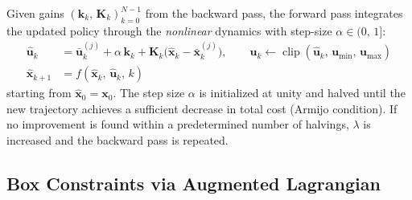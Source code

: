 \documentclass[12pt, a4paper]{article}
\begin{document}
Given gains $(\bm{k}_k,\, \bm{K}_k)_{k=0}^{N-1}$ from the backward pass, the
forward pass integrates the updated policy through the \emph{nonlinear} dynamics
with step-size $\alpha \in (0,\, 1]$:
%
\begin{align}
    \hat{\bm{u}}_k &= \bar{\bm{u}}_k^{(j)}
        + \alpha\,\bm{k}_k
        + \bm{K}_k\bigl(\hat{\bm{x}}_k - \bar{\bm{x}}_k^{(j)}\bigr),
    \qquad
    \hat{\bm{u}}_k \leftarrow
        \operatorname{clip}\!\left(\hat{\bm{u}}_k,\,
        \bm{u}_{\min},\, \bm{u}_{\max}\right)
    \label{eq:fwd_u_app} \\[4pt]
    \hat{\bm{x}}_{k+1} &= f\!\left(\hat{\bm{x}}_k,\,
        \hat{\bm{u}}_k,\, k\right)
    \label{eq:fwd_x_app}
\end{align}
%
starting from $\hat{\bm{x}}_0 = \bm{x}_0$. The step size $\alpha$ is
initialized at unity and halved until the new trajectory achieves a sufficient
decrease in total cost (Armijo condition). If no improvement is found within a
predetermined number of halvings, $\lambda$ is increased and the backward pass
is repeated.

\subsection{Box Constraints via Augmented Lagrangian}
\label{app:constraints}
\end{document}
